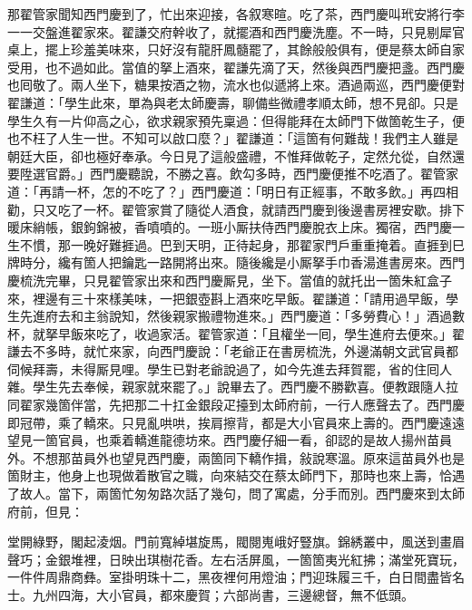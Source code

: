 那翟管家聞知西門慶到了，忙出來迎接，各叙寒暄。吃了茶，西門慶叫玳安將行李一一交盤進翟家來。翟謙交府幹收了，就擺酒和西門慶洗塵。不一時，只見剔犀官桌上，擺上珍羞美味來，只好沒有龍肝鳳髓罷了，其餘般般俱有，便是蔡太師自家受用，也不過如此。當值的拏上酒來，翟謙先滴了天，然後與西門慶把盞。西門慶也囘敬了。兩人坐下，糖果按酒之物，流水也似遞將上來。酒過兩巡，西門慶便對翟謙道：「學生此來，單為與老太師慶壽，聊備些微禮孝順太師，想不見卻。只是學生久有一片仰高之心，欲求親家預先稟過：但得能拜在太師門下做箇乾生子，便也不枉了人生一世。{}不知可以啟口麼？」翟謙道：「這箇有何難哉！我們主人雖是朝廷大臣，卻也極好奉承。今日見了這般盛禮，不惟拜做乾子，定然允從，自然還要陞選官爵。」{}西門慶聽說，不勝之喜。飲勾多時，西門慶便推不吃酒了。翟管家道：「再請一杯，怎的不吃了？」西門慶道：「明日有正經事，不敢多飲。」再四相勸，只又吃了一杯。翟管家賞了隨從人酒食，就請西門慶到後邊書房裡安歇。排下暖床綃帳，銀鉤錦被，香噴噴的。一班小厮扶侍西門慶脫衣上床。獨宿，西門慶一生不慣，那一晚好難捱過。巴到天明，正待起身，那翟家門戶重重掩着。直捱到巳牌時分，纔有箇人把鑰匙一路開將出來。隨後纔是小厮拏手巾香湯進書房來。西門慶梳洗完畢，只見翟管家出來和西門慶厮見，坐下。當值的就托出一箇朱紅盒子來，裡邊有三十來樣美味，一把銀壺斟上酒來吃早飯。翟謙道：「請用過早飯，學生先進府去和主翁說知，然後親家搬禮物進來。」西門慶道：「多勞費心！」酒過數杯，就拏早飯來吃了，收過家活。翟管家道：「且權坐一囘，學生進府去便來。」翟謙去不多時，就忙來家，{}向西門慶說：「老爺正在書房梳洗，外邊滿朝文武官員都伺候拜壽，未得厮見哩。學生已對老爺說過了，如今先進去拜賀罷，省的住囘人雜。學生先去奉候，親家就來罷了。」說畢去了。西門慶不勝歡喜。便教跟隨人拉同翟家幾箇伴當，先把那二十扛金銀段疋擡到太師府前，一行人應聲去了。西門慶即冠帶，乘了轎來。只見亂哄哄，挨肩擦背，都是大小官員來上壽的。西門慶遠遠望見一箇官員，也乘着轎進龍德坊來。西門慶仔細一看，卻認的是故人揚州苗員外。不想那苗員外也望見西門慶，兩箇同下轎作揖，敍說寒溫。原來這苗員外也是箇財主，他身上也現做着散官之職，向來結交在蔡太師門下，那時也來上壽，恰遇了故人。當下，兩箇忙匆匆路次話了幾句，問了寓處，分手而別。{}西門慶來到太師府前，但見：

\begin{myquote}
堂開綠野，閣起淩烟。門前寬綽堪旋馬，閥閱嵬峨好豎旗。錦綉叢中，風送到畫眉聲巧；金銀堆裡，日映出琪樹花香。左右活屏風，一箇箇夷光紅拂；滿堂死寶玩，一件件周鼎商彝。室掛明珠十二，黑夜裡何用燈油；門迎珠履三千，白日間盡皆名士。九州四海，大小官員，都來慶賀；六部尚書，三邊總督，無不低頭。
\end{myquote}

